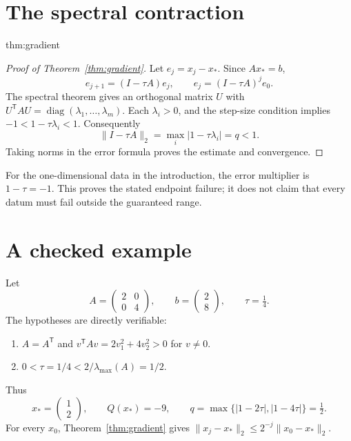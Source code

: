 \documentclass[12pt,reqno]{amsart}
\begin{document}
\section{The spectral contraction}\label{sec:contraction}
\begin{theoremrecall}{thm:gradient}

\end{theoremrecall}
\begin{proof}[Proof of Theorem~\ref{thm:gradient}]
Let $e_j=x_j-x_*$. Since $Ax_*=b$,
\[
e_{j+1}=(I-\tau A)e_j,\qquad e_j=(I-\tau A)^j e_0.
\]
The spectral theorem gives an orthogonal matrix $U$ with
$U^{\mathsf T}AU=\operatorname{diag}(\lambda_1,\ldots,\lambda_m)$.
Each $\lambda_i>0$, and the step-size condition implies
$-1<1-\tau\lambda_i<1$. Consequently
\[
\|I-\tau A\|_2=\max_i|1-\tau\lambda_i|=q<1.
\]
Taking norms in the error formula proves the estimate and convergence.
\end{proof}
For the one-dimensional data in the introduction, the error multiplier is
$1-\tau=-1$. This proves the stated endpoint failure; it does not claim
that every datum must fail outside the guaranteed range.

\section{A checked example}\label{sec:example}
Let
\[
A=\begin{pmatrix}2&0\\0&4\end{pmatrix},\qquad
b=\begin{pmatrix}2\\8\end{pmatrix},\qquad \tau=\tfrac14.
\]
The hypotheses are directly verifiable:
\begin{enumerate}
\item $A=A^{\mathsf T}$ and $v^{\mathsf T}Av=2v_1^2+4v_2^2>0$ for $v\ne0$.
\item $0<\tau=1/4<2/\lambda_{\max}(A)=1/2$.
\end{enumerate}
Thus
\[
x_*=\begin{pmatrix}1\\2\end{pmatrix},\qquad Q(x_*)=-9,\qquad
q=\max\{|1-2\tau|,|1-4\tau|\}=\tfrac12.
\]
For every $x_0$, Theorem~\ref{thm:gradient} gives
$\|x_j-x_*\|_2\leq2^{-j}\|x_0-x_*\|_2$.

\end{document}
